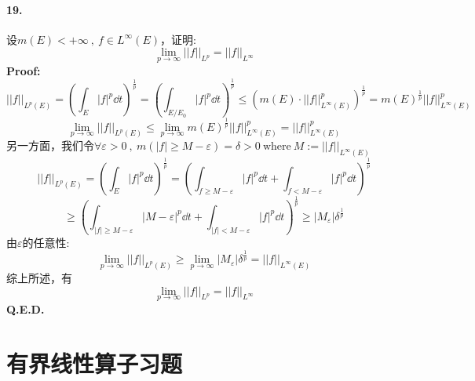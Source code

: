 \paragraph*{19.}设$m(E)<+\infty \ , \ f \in L^{\infty}(E)$，证明:
\[\lim_{p \to \infty}||f||_{L^p}=||f||_{L^{\infty}}\]
\textbf{Proof:}
\[||f||_{L^p(E)}=\left(\int_E|f|^p\dd t\right)^{\frac{1}{p}}=\left(\int_{E/E_0}|f|^p\dd t\right)^{\frac{1}{p}} \leq \left(m(E) \cdot ||f||^p_{L^{\infty}(E)}\right)^{\frac{1}{p}}=m(E)^{\frac{1}{p}}||f||^p_{L^{\infty}(E)}\]
\[\lim_{p \to \infty}||f||_{L^p(E)} \leq \lim_{p \to \infty}m(E)^{\frac{1}{p}}||f||^p_{L^{\infty}(E)}=||f||^p_{L^{\infty}(E)}\]
另一方面，我们令$\forall \varepsilon>0 \ , \ m(|f| \geq M-\varepsilon)=\delta>0 \ \text{where} \ M:=||f||_{L^{\infty}(E)}$
\[||f||_{L^p(E)}=\left(\int_E|f|^p\dd t\right)^{\frac{1}{p}}=\left(\int_{f \geq M-\varepsilon}|f|^p\dd t+\int_{f<M-\varepsilon}|f|^p\dd t\right)^{\frac{1}{p}}\]
\[\geq \left(\int_{|f| \geq M-\varepsilon}|M-\varepsilon|^p\dd t+\int_{|f|<M-\varepsilon}|f|^p\dd t\right)^{\frac{1}{p}} \geq |M_\varepsilon|\delta^{\frac{1}{p}}\]
由$\varepsilon$的任意性:
\[\lim_{p \to \infty}||f||_{L^p(E)} \geq \lim_{p \to \infty} |M_\varepsilon|\delta^{\frac{1}{p}}=||f||_{L^{\infty}(E)}\]
综上所述，有
\[\lim_{p \to \infty}||f||_{L^p}=||f||_{L^{\infty}}\]
\textbf{Q.E.D.}

\section{有界线性算子习题}
